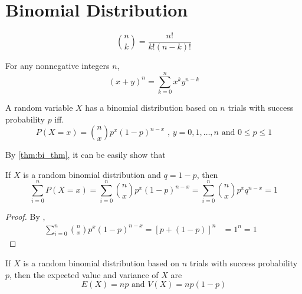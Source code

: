 \section{Binomial Distribution}

\begin{definition}\label{def:bi_coeff}
    \[
    \binom{n}{k} = \frac{n!}{k!(n-k)!}    
    \]
\end{definition}

\begin{theorem}\label{thm:bi_thm}
    For any nonnegative integers $n$, 
    \[(x+y)^n = \sum_{k = 0}^n {x^k y^{n - k}}\]
\end{theorem}

\begin{definition}\label{def:bi_dist}
    A random variable $X$ has a binomial distribution 
    based on $n$ trials with success probability $p$ iff.
    \[
        P(X=x) = \binom{n}{x} p^x (1 - p)^{n - x} \text{ , }
        y = 0, 1, \ldots, n \text{ and } 0 \leq p \leq 1
        \]
\end{definition}

By \ref{thm:bi_thm}, it can be easily show that
\begin{corollary}\label{thm:bi_sum_to_one}
    If $X$ is a random binomial distribution and $q = 1-p$, then
    \[
    \sum_{i = 0}^n{P(X=x)} = 
        \sum_{i = 0}^n{\binom{n}{x} p^x (1 - p)^{n - x}}
        = \sum_{i = 0}^n{\binom{n}{x} p^x q^{n - x}}
        = 1
    \] 
\end{corollary}
\begin{proof}
    By , 
    \begin{align*}
        \sum_{i = 0}^n{\binom{n}{x} p^x (1 - p)^{n - x}}
        = {[p + (1-p)]}^n 
        &= 1^n = 1 &
    \end{align*}
\end{proof}


\begin{theorem}
    If $X$ is a random binomial distribution based on $n$ trials with success probability $p$, then the expected value and variance of $X$ are
    \[
        E(X) = np \text{ and } V(X) = np(1-p)
    \]
\end{theorem}

